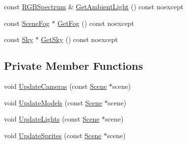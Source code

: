 \begin{DoxyCompactItemize}
\item 
const \hyperlink{structmage_1_1_r_g_b_spectrum}{R\+G\+B\+Spectrum} \& \hyperlink{structmage_1_1_pass_buffer_a91cbe609833b84c12113c9676b9de903}{Get\+Ambient\+Light} () const noexcept
\item 
const \hyperlink{structmage_1_1_scene_fog}{Scene\+Fog} $\ast$ \hyperlink{structmage_1_1_pass_buffer_a406b7dcb655d3689f0a4400edc2e9bf8}{Get\+Fog} () const noexcept
\item 
const \hyperlink{structmage_1_1_sky}{Sky} $\ast$ \hyperlink{structmage_1_1_pass_buffer_af6355cb9bd927f53bb93347348f21a11}{Get\+Sky} () const noexcept
\end{DoxyCompactItemize}
\subsection*{Private Member Functions}
\begin{DoxyCompactItemize}
\item 
void \hyperlink{structmage_1_1_pass_buffer_a1ded2ce7cadbcb176aec69a85ba81c3e}{Update\+Cameras} (const \hyperlink{classmage_1_1_scene}{Scene} $\ast$scene)
\item 
void \hyperlink{structmage_1_1_pass_buffer_a02d68f950566e8283d3fc74bdf19b66a}{Update\+Models} (const \hyperlink{classmage_1_1_scene}{Scene} $\ast$scene)
\item 
void \hyperlink{structmage_1_1_pass_buffer_a91a779121ecb4c08605d3073c34674c9}{Update\+Lights} (const \hyperlink{classmage_1_1_scene}{Scene} $\ast$scene)
\item 
void \hyperlink{structmage_1_1_pass_buffer_a8301fd646965c627f29120f412078ca1}{Update\+Sprites} (const \hyperlink{classmage_1_1_scene}{Scene} $\ast$scene)
\end{DoxyCompactItemize}
